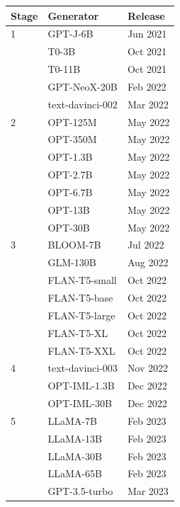 \begin{tabular}{lll}
\toprule
Stage & Generator & Release \\
\midrule
1 & GPT-J-6B & Jun 2021 \\
 & T0-3B & Oct 2021 \\
 & T0-11B & Oct 2021 \\
 & GPT-NeoX-20B & Feb 2022 \\
 & text-davinci-002 & Mar 2022 \\
\midrule
2 & OPT-125M & May 2022 \\
 & OPT-350M & May 2022 \\
 & OPT-1.3B & May 2022 \\
 & OPT-2.7B & May 2022 \\
 & OPT-6.7B & May 2022 \\
 & OPT-13B & May 2022 \\
 & OPT-30B & May 2022 \\
\midrule
3 & BLOOM-7B & Jul 2022 \\
 & GLM-130B & Aug 2022 \\
 & FLAN-T5-small & Oct 2022 \\
 & FLAN-T5-base & Oct 2022 \\
 & FLAN-T5-large & Oct 2022 \\
 & FLAN-T5-XL & Oct 2022 \\
 & FLAN-T5-XXL & Oct 2022 \\
\midrule
4 & text-davinci-003 & Nov 2022 \\
 & OPT-IML-1.3B & Dec 2022 \\
 & OPT-IML-30B & Dec 2022 \\
\midrule
5 & LLaMA-7B & Feb 2023 \\
 & LLaMA-13B & Feb 2023 \\
 & LLaMA-30B & Feb 2023 \\
 & LLaMA-65B & Feb 2023 \\
 & GPT-3.5-turbo & Mar 2023 \\
\bottomrule
\end{tabular}
